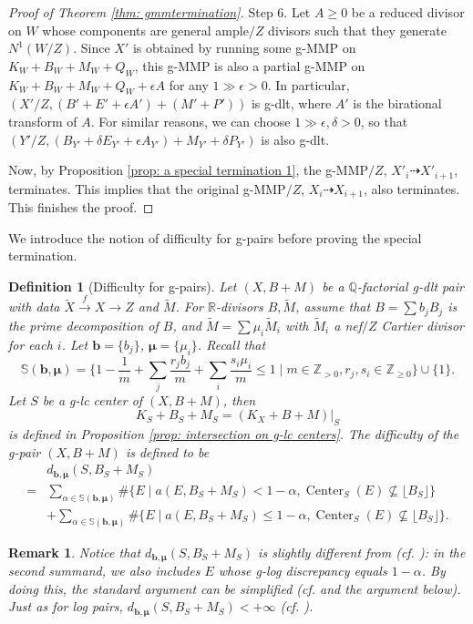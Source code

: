 \documentclass[11pt]{amsart}
\newcommand{\Zz}{\mathbb{Z}}
\newcommand{\Rr}{\mathbb{R}}
\newcommand{\Qq}{\mathbb{Q}}
\newcommand{\Center}{\operatorname{Center}}
\newtheorem{definition}[theorem]{Definition}
\newtheorem{remark}[theorem]{Remark}
\begin{document}
\begin{proof}[Proof of Theorem \ref{thm: gmmtermination}]
Step 6. Let $A\ge0$ be a reduced divisor on $W$ whose components are general ample$/Z$ divisors such that they generate $N^1(W/Z)$. Since $X'$ is obtained by running some g-MMP on $K_W+B_W+M_W+Q_W$, this g-MMP is also a partial g-MMP on $K_W+B_W+M_W+Q_W+\epsilon A$ for any $1 \gg \epsilon>0$. In particular, $(X'/Z,(B'+E'+\epsilon A')+(M'+P'))$ is g-dlt, where $A'$ is the birational transform of $A$. For similar reasons, we can choose $1\gg\epsilon,\delta>0$, so that $(Y'/Z,(B_{Y'}+\delta E_{Y'}+\epsilon A_{Y'})+M_{Y'}+\delta P_{Y'})$ is also g-dlt.

Now, by Proposition \ref{prop: a special termination 1}, the g-MMP$/Z$, $X'_i \dashrightarrow X'_{i+1}$, terminates. This implies that the original g-MMP$/Z$, $X_i \dashrightarrow X_{i+1}$, also terminates. This finishes the proof.
\end{proof}

We introduce the notion of difficulty for g-pairs before proving the special termination. 



\begin{definition}[Difficulty for g-pairs]
	Let $(X,B+M)$ be a $\Qq$-factorial g-dlt pair with data $\tilde X \xrightarrow{f} X \to Z$ and $\tilde M$. For $\Rr$-divisors $B, \tilde M$, assume that $B=\sum b_j B_j$ is the prime decomposition of $B$, and $\tilde M=\sum \mu_i \tilde M_i$ with $\tilde M_i$ a nef$/Z$ Cartier divisor for each $i$.
	Let $\bm{b}=\{b_j\}$, $\bm{\mu}=\{\mu_i\}$. Recall that
	\[\mathbb{S}(\bm{b},\bm{\mu})= \{1-\frac{1}{m}+\sum_{j} \frac{r_jb_j}{m}+\sum_{i}\frac{s_i \mu_i}{m} \leq 1\mid m\in\mathbb{Z}_{>0},r_j,s_i\in\Zz_{\ge0}\}\cup\{1\}.\]
	Let $S$ be a g-lc center of $(X,B+M)$, then
	\[
	K_{S}+B_{S}+M_{S} = (K_{X}+B+M)|_{S}
	\] is defined in Proposition \ref{prop: intersection on g-lc centers}.
	The \emph{difficulty} of the g-pair $(X,B+M)$ is defined to be
	\begin{align*}
	&d_{\bm{b},\bm{\mu}}(S,B_S+M_S)\\
	=&\sum_{\alpha\in \mathbb{S}(\bm{b},\bm{\mu})}\#\{E \mid a(E,B_S+M_S)<1-\alpha,\Center_{S}(E)\nsubseteq \lfloor B_S \rfloor\}\\
	&+\sum_{\alpha\in\mathbb{S}(\bm{b},\bm{\mu})}\#\{E \mid a(E,B_S+M_S)\le1-\alpha, \Center_{S}(E)\nsubseteq \lfloor B_S \rfloor\}.
	\end{align*}
\end{definition}

\begin{remark}
Notice that $d_{\bm{b},\bm{\mu}}(S,B_S+M_S)$ is slightly different from \cite[Definition 4.2.9]{Fujino07} (cf. \cite[7.5.1 Definition]{Fli92}): in the second summand, we also includes $E$ whose g-log discrepancy \emph{equals} $1-\alpha$. By doing this, the standard argument can be simplified (cf. \cite[Proposition 4.2.14]{Fujino07} and the argument below). Just as for log pairs, $d_{\bm{b},\bm{\mu}}(S,B_S+M_S)<+\infty$ (cf. \cite[4.12.2 Lemma]{Fli92}). 
\end{remark}
\end{document}
